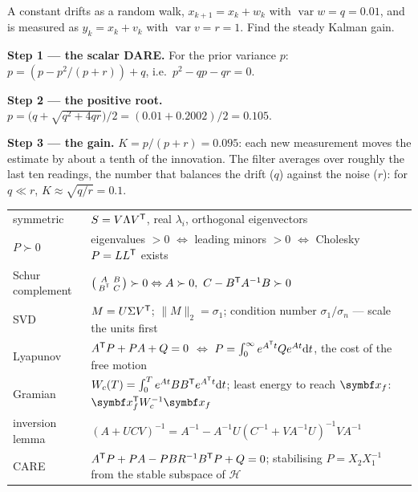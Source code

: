 \begin{example}
\label{ex:I-kalman}
A constant drifts as a random walk, $x_{k+1} = x_k + w_k$ with $\operatorname{var} w = q = 0.01$, and is measured as $y_k = x_k + v_k$ with $\operatorname{var} v = r = 1$. Find the steady Kalman gain.

\textbf{Step 1 — the scalar DARE.} For the prior variance $p$: $p = (p - p^2/(p + r)) + q$, i.e.\ $p^2 - qp - qr = 0$.

\textbf{Step 2 — the positive root.} $p = \big(q + \sqrt{q^2 + 4qr}\big)/2 = (0.01 + 0.2002)/2 = 0.105$.

\textbf{Step 3 — the gain.} $K = p/(p + r) = 0.095$: each new measurement moves the estimate by about a tenth of the innovation. The filter averages over roughly the last ten readings, the number that balances the drift ($q$) against the noise ($r$): for $q \ll r$, $K \approx \sqrt{q/r} = 0.1$.
\end{example}

\begin{result}
\begin{center}\small
\renewcommand{\arraystretch}{1.4}
\begin{tabularx}{\linewidth}{@{}l>{\raggedright\arraybackslash}X@{}}
symmetric & $S = V\Lambda V^{\mathsf{T}}$, real $\lambda_i$, orthogonal eigenvectors\\
$P \succ 0$ & eigenvalues $> 0$ \;$\Leftrightarrow$\; leading minors $> 0$ \;$\Leftrightarrow$\; Cholesky $P = LL^{\mathsf{T}}$ exists\\
Schur complement & $\begin{psmallmatrix}A & B\\ B^{\mathsf{T}} & C\end{psmallmatrix} \succ 0 \Leftrightarrow A \succ 0,\ C - B^{\mathsf{T}} A^{-1}B \succ 0$\\
SVD & $M = U\Sigma V^{\mathsf{T}}$; $\|M\|_2 = \sigma_1$; condition number $\sigma_1/\sigma_n$ — scale the units first\\
Lyapunov & $A^{\mathsf{T}} P + PA + Q = 0$ \;$\Leftrightarrow$\; $P = \int_0^\infty e^{A^{\mathsf{T}} t}Qe^{At}\mathrm{d} t$, the cost of the free motion\\
Gramian & $W_c(T) = \int_0^T e^{At}BB^{\mathsf{T}} e^{A^{\mathsf{T}} t}\mathrm{d} t$; least energy to reach $\vx_f$: $\vx_f^\T W_c^{-1}\vx_f$\\
inversion lemma & $(A + UCV)^{-1} = A^{-1} - A^{-1}U(C^{-1} + VA^{-1}U)^{-1}VA^{-1}$\\
CARE & $A^{\mathsf{T}} P + PA - PBR^{-1}B^{\mathsf{T}} P + Q = 0$; stabilising $P = X_2X_1^{-1}$ from the stable subspace of $\mathcal H$\\
\end{tabularx}
\end{center}
\end{result}
